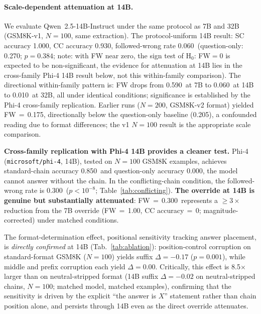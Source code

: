 \documentclass{article}
\theoremstyle{definition}
\theoremstyle{definition}
\newcommand{\SBCCFW}{1.00}
\newcommand{\PHIFOURSCACC}{0.850}
\newcommand{\PHIFOURCCFW}{0.300}
\newcommand{\PHIFOURQOACC}{0.000}
\newcommand{\PHIFOURCCPVAL}{$p{<}10^{-8}$}
\newcommand{\PHIFOURN}{100}
\newcommand{\QWTBCCFW}{0.010}
\newcommand{\QWSBVONEFW}{0.590}
\newcommand{\QBVONESCACC}{1.000}
\newcommand{\QBVONECCACC}{0.930}
\newcommand{\QBVONEFW}{0.060}
\newcommand{\QBVONEQOACC}{0.270}
\newcommand{\QBVONEN}{100}
\newcommand{\QBVONEPVAL}{$p{=}0.384$}
\begin{document}
\paragraph{Scale-dependent attenuation at 14B.}
\label{sec:14b}
We evaluate Qwen~2.5-14B-Instruct under the same protocol as 7B and 32B
(GSM8K-v1, $N{=}\QBVONEN$, same extraction). The protocol-uniform
14B result: SC accuracy \QBVONESCACC, CC accuracy \QBVONECCACC,
followed-wrong rate \QBVONEFW\ (question-only: \QBVONEQOACC;
\QBVONEPVAL; note: with FW near zero, the sign test of H$_0$: FW$=0$
is expected to be non-significant, the evidence for attenuation at 14B
lies in the cross-family Phi-4 14B result below, not this within-family
comparison). The directional within-family pattern is:
FW drops from \QWSBVONEFW\ at 7B to \QBVONEFW\ at 14B to
\QWTBCCFW\ at 32B, all under identical conditions; significance is
established by the Phi-4 cross-family replication.
Earlier runs ($N{=}200$, GSM8K-v2 format) yielded FW\,$=$\,0.175,
directionally below the question-only baseline (0.205), a confounded
reading due to format differences; the v1 $N{=}100$ result is the
appropriate scale comparison.

\textbf{Cross-family replication with Phi-4 14B provides a cleaner test.}
Phi-4 (\texttt{microsoft/phi-4}, 14B), tested on $N{=}\PHIFOURN$ GSM8K
examples, achieves standard-chain accuracy \PHIFOURSCACC\ and question-only
accuracy \PHIFOURQOACC, the model cannot answer without the chain.
In the conflicting-chain condition, the followed-wrong rate is \PHIFOURCCFW\
(\PHIFOURCCPVAL; Table~\ref{tab:conflicting}).
\textbf{The override at 14B is genuine but substantially attenuated}:
FW\,$=$\,\PHIFOURCCFW\ represents a $\geq{}3{\times}$ reduction from
the 7B override (FW\,$=$\,\SBCCFW, CC accuracy$\,=\,$0; magnitude-corrected) under matched conditions.

The format-determination effect, positional sensitivity tracking answer
placement, is \emph{directly confirmed} at 14B (Tab.~\ref{tab:ablation}):
position-control corruption on standard-format GSM8K ($N{=}100$) yields
suffix $\Delta{=}{-0.17}$ ($p{=}0.001$), while middle and prefix corruption
each yield $\Delta{=}0.00$. Critically, this effect is 8.5$\times$ larger than on
neutral-stripped format (14B suffix $\Delta{=}{-0.02}$ on neutral-stripped chains,
$N{=}100$; matched model, matched examples), confirming that the sensitivity
is driven by the explicit ``the answer is $X$'' statement rather than chain
position alone, and persists through 14B even as the direct override attenuates.
\end{document}
